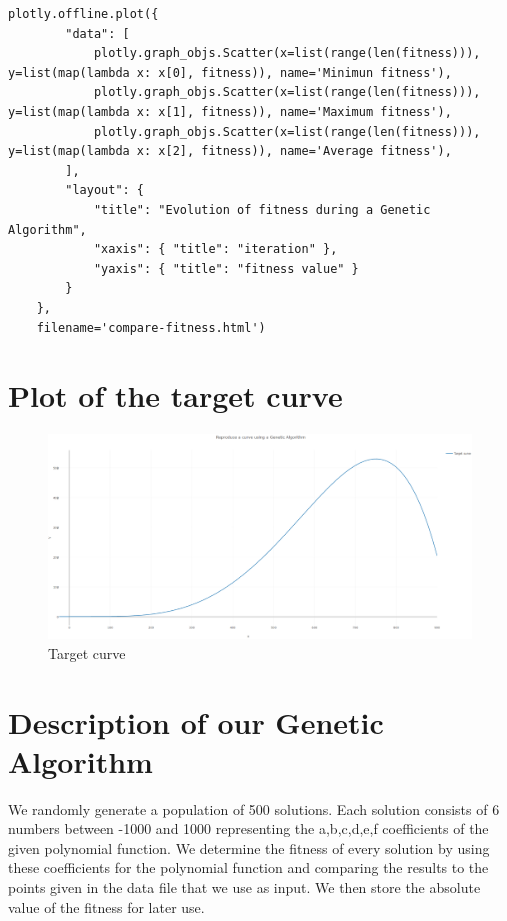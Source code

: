 \documentclass[12pt]{article}
\begin{document}
\begin{lstlisting}[frame=single,caption=Compute of the fitness value]
plotly.offline.plot({
        "data": [
            plotly.graph_objs.Scatter(x=list(range(len(fitness))), y=list(map(lambda x: x[0], fitness)), name='Minimun fitness'),
            plotly.graph_objs.Scatter(x=list(range(len(fitness))), y=list(map(lambda x: x[1], fitness)), name='Maximum fitness'),
            plotly.graph_objs.Scatter(x=list(range(len(fitness))), y=list(map(lambda x: x[2], fitness)), name='Average fitness'),
        ],
        "layout": {
            "title": "Evolution of fitness during a Genetic Algorithm",
            "xaxis": { "title": "iteration" },
            "yaxis": { "title": "fitness value" }
        }
    },
    filename='compare-fitness.html')
\end{lstlisting}

\section{Plot of the target curve}

\begin{figure}[H]
	\centering
	\includegraphics[width=1.0\columnwidth, angle=270]{./plot_target.png}
	\caption{Target curve}
\end{figure}

\section{Description of our Genetic Algorithm}

We randomly generate a population of 500 solutions. Each solution consists of 6 numbers between -1000 and 1000 representing the a,b,c,d,e,f coefficients of the given polynomial function. We determine the fitness of every solution by using these coefficients for the polynomial function and comparing the results to the points given in the data file that we use as input. We then store the absolute value of the fitness for later use.
\end{document}
